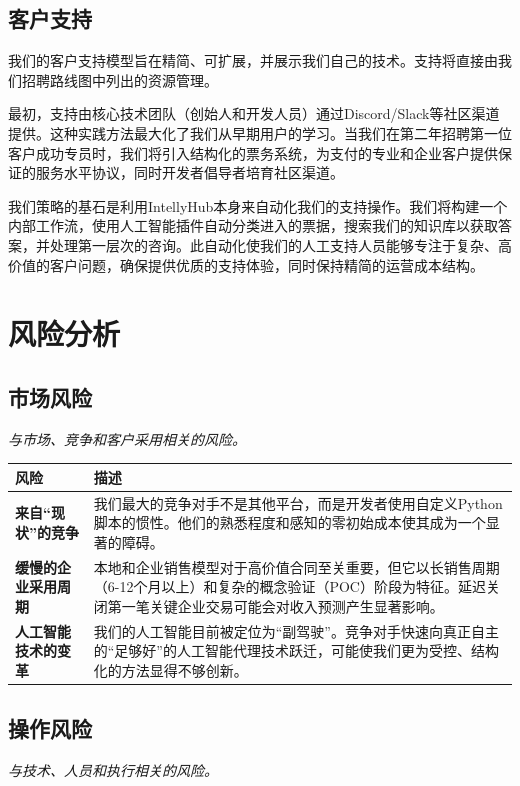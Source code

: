 \documentclass[11pt, a4paper, oneside]{article}
\begin{document}
\subsection{客户支持}
我们的客户支持模型旨在精简、可扩展，并展示我们自己的技术。支持将直接由我们招聘路线图中列出的资源管理。

最初，支持由核心技术团队（创始人和开发人员）通过Discord/Slack等社区渠道提供。这种实践方法最大化了我们从早期用户的学习。当我们在第二年招聘第一位客户成功专员时，我们将引入结构化的票务系统，为支付的专业和企业客户提供保证的服务水平协议，同时开发者倡导者培育社区渠道。

我们策略的基石是利用IntellyHub本身来自动化我们的支持操作。我们将构建一个内部工作流，使用人工智能插件自动分类进入的票据，搜索我们的知识库以获取答案，并处理第一层次的咨询。此自动化使我们的人工支持人员能够专注于复杂、高价值的客户问题，确保提供优质的支持体验，同时保持精简的运营成本结构。

\newpage
\section{风险分析}
\subsection{市场风险}
\textit{与市场、竞争和客户采用相关的风险。}

\begin{table}[H]
\centering
\begin{tabularx}{\textwidth}{@{}lL@{}}
\toprule
\textbf{风险} & \textbf{描述} \\
\midrule
\textbf{来自“现状”的竞争} & 我们最大的竞争对手不是其他平台，而是开发者使用自定义Python脚本的惯性。他们的熟悉程度和感知的零初始成本使其成为一个显著的障碍。 \\
\addlinespace
\textbf{缓慢的企业采用周期} & 本地和企业销售模型对于高价值合同至关重要，但它以长销售周期（6-12个月以上）和复杂的概念验证（POC）阶段为特征。延迟关闭第一笔关键企业交易可能会对收入预测产生显著影响。 \\
\addlinespace
\textbf{人工智能技术的变革} & 我们的人工智能目前被定位为“副驾驶”。竞争对手快速向真正自主的“足够好”的人工智能代理技术跃迁，可能使我们更为受控、结构化的方法显得不够创新。 \\
\bottomrule
\end{tabularx}
\end{table}

\subsection{操作风险}
\textit{与技术、人员和执行相关的风险。}
\end{document}
